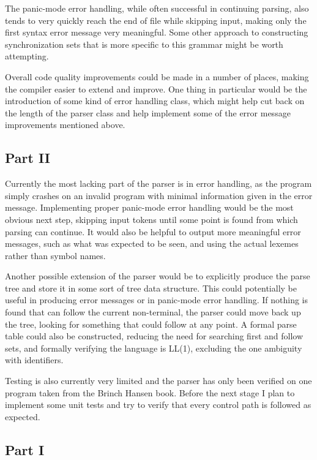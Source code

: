 \documentclass{article}
\begin{document}
        The panic-mode error handling, while often successful in continuing parsing, also tends to very quickly reach the end of file while skipping input, making only the first syntax error message very meaningful. Some other approach to constructing synchronization sets that is more specific to this grammar might be worth attempting. 

        Overall code quality improvements could be made in a number of places, making the compiler easier to extend and improve. One thing in particular would be the introduction of some kind of error handling class, which might help cut back on the length of the parser class and help implement some of the error message improvements mentioned above.

        \subsection{Part II}

        Currently the most lacking part of the parser is in error handling, as the program simply crashes on an invalid program with minimal information given in the error message. Implementing proper panic-mode error handling would be the most obvious next step, skipping input tokens until some point is found from which parsing can continue. It would also be helpful to output more meaningful error messages, such as what was expected to be seen, and using the actual lexemes rather than symbol names. 

        Another possible extension of the parser would be to explicitly produce the parse tree and store it in some sort of tree data structure. This could potentially be useful in producing error messages or in panic-mode error handling. If nothing is found that can follow the current non-terminal, the parser could move back up the tree, looking for something that could follow at any point. A formal parse table could also be constructed, reducing the need for searching first and follow sets, and formally verifying the language is LL(1), excluding the one ambiguity with identifiers.

        Testing is also currently very limited and the parser has only been verified on one program taken from the Brinch Hansen book. Before the next stage I plan to implement some unit tests and try to verify that every control path is followed as expected. 

        \subsection{Part I}
\end{document}
